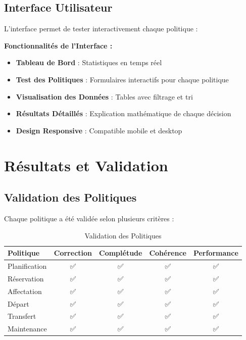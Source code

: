 \documentclass[12pt,a4paper]{article}
\begin{document}
    \subsection{Interface Utilisateur}

    L'interface permet de tester interactivement chaque politique :

    \begin{resultbox}
        \textbf{Fonctionnalités de l'Interface :}
        \begin{itemize}
            \item \textbf{Tableau de Bord} : Statistiques en temps réel
            \item \textbf{Test des Politiques} : Formulaires interactifs pour chaque politique
            \item \textbf{Visualisation des Données} : Tables avec filtrage et tri
            \item \textbf{Résultats Détaillés} : Explication mathématique de chaque décision
            \item \textbf{Design Responsive} : Compatible mobile et desktop
        \end{itemize}
    \end{resultbox}

    \newpage

    \section{Résultats et Validation}

    \subsection{Validation des Politiques}

    Chaque politique a été validée selon plusieurs critères :

    \begin{table}[H]
        \centering
        \begin{tabular}{|l|c|c|c|c|}
            \hline
            \textbf{Politique} & \textbf{Correction} & \textbf{Complétude} & \textbf{Cohérence} & \textbf{Performance} \\
            \hline
            Planification & ✅ & ✅ & ✅ & ✅ \\
            Réservation & ✅ & ✅ & ✅ & ✅ \\
            Affectation & ✅ & ✅ & ✅ & ✅ \\
            Départ & ✅ & ✅ & ✅ & ✅ \\
            Transfert & ✅ & ✅ & ✅ & ✅ \\
            Maintenance & ✅ & ✅ & ✅ & ✅ \\
            \hline
        \end{tabular}
        \caption{Validation des Politiques}
    \end{table}
\end{document}

